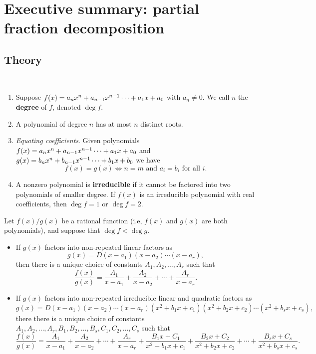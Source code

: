 \newpage

\section{Executive summary: partial fraction decomposition}

\thispagestyle{fancy}


 \subsection*{Theory}
 \begin{namedtheorem}\
   \begin{enumerate}
     \item Suppose $f(x)=a_nx^n+a_{n-1}x^{n-1}\cdots +a_1x+a_0$ with $a_n\ne 0$. We call $n$ the {\bf degree} of $f$, denoted $\deg f$.
     \item A polynomial of degree $n$ has at most $n$ distinct roots.
     \item {\em Equating coefficients}. Given polynomials $f(x)=a_nx^n+a_{n-1}x^{n-1}\cdots +a_1x+a_0$ and $g(x)=b_{n}x^{n}+b_{n-1}x^{n-1}\cdots +b_1x+b_0$ we have
     \[
     f(x)=g(x) \iff n=m \text{ and } a_i=b_i \text{ for all $i$.}
     \]
     \item A nonzero polynomial is {\bf irreducible} if it cannot be factored into two polynomials of smaller degree. If $f(x)$ is an irreducible polynomial with real coefficients, then $\deg f=1$ or $\deg f=2$.
   \end{enumerate}

 \end{namedtheorem}
\begin{namedtheorem} Let $f(x)/g(x)$ be a rational function (i.e, $f(x)$ and $g(x)$ are both polynomials), and suppose that $\boxed{\deg f<\deg g}$.
\begin{itemize}
  \item If $g(x)$ factors into non-repeated linear factors as
  \[
  g(x)=D(x-a_1)(x-a_2)\cdots (x-a_r),
  \]
  then there is a unique choice of constants $A_1, A_2,\dots, A_r$ such that
  \[
  \frac{f(x)}{g(x)}=\frac{A_1}{x-a_1}+\frac{A_2}{x-a_2}+\cdots +\frac{A_r}{x-a_r}.
  \]
  \item If $g(x)$ factors into non-repeated irreducible linear and quadratic factors as
  \[
  g(x)=D(x-a_1)(x-a_2)\cdots (x-a_r)(x^2+b_1x+c_1)(x^2+b_2x+c_2)\cdots (x^2+b_sx+c_s),
  \]
  there there is a unique choice of constants $A_1,A_2,\dots, A_r, B_1,B_2,\dots, B_s, C_1, C_2,\dots, C_s$ such that
  \[
  \frac{f(x)}{g(x)}=\frac{A_1}{x-a_1}+\frac{A_2}{x-a_2}+\cdots +\frac{A_r}{x-a_r}+\frac{B_1x+C_1}{x^2+b_1x+c_1}+\frac{B_2x+C_2}{x^2+b_2x+c_2}+\cdots +\frac{B_sx+C_s}{x^2+b_sx+c_s}.
  \]
\end{itemize}
\end{namedtheorem}
